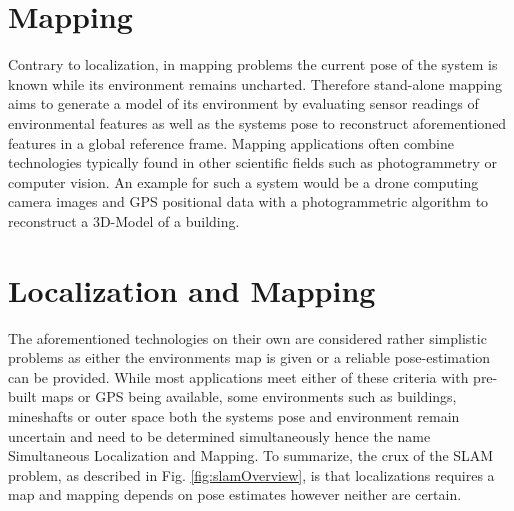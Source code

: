 \section{Mapping}
Contrary to localization, in mapping problems the current pose of the system is known while its environment remains uncharted.
Therefore stand-alone mapping aims to generate a model of its environment by evaluating sensor readings of environmental features as well as the systems pose to reconstruct aforementioned features in a global reference frame. 
Mapping applications often combine technologies typically found in other scientific fields such as photogrammetry or computer vision.
An example for such a system would be a drone computing camera images and GPS positional data with a photogrammetric algorithm to reconstruct a 3D-Model of a building. 


\section{Localization and Mapping}
The aforementioned technologies on their own are considered rather simplistic problems as either the environments map is given or a reliable pose-estimation can be provided. While most applications meet either of these criteria with pre-built maps or GPS being available, some environments such as buildings, mineshafts or outer space both the systems pose and environment remain uncertain and need to be determined simultaneously hence the name Simultaneous Localization and Mapping. 
To summarize, the crux of the SLAM problem, as described in Fig. \ref{fig:slamOverview}, is that localizations requires a map and mapping depends on pose estimates however neither are certain. 





